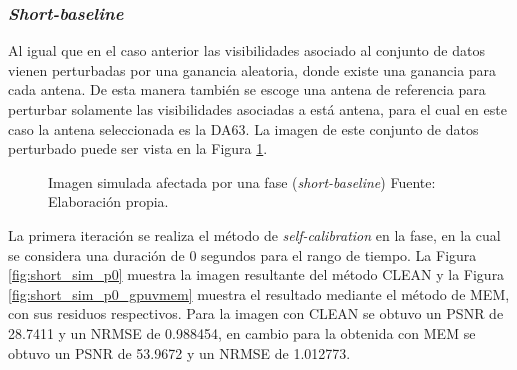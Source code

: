 \subsubsection{\textit{Short-baseline}}

Al igual que en el caso anterior las visibilidades asociado al conjunto de datos vienen perturbadas por una ganancia aleatoria, donde existe una ganancia para cada antena. De esta manera también se escoge una antena de referencia para perturbar solamente las visibilidades asociadas a está antena, para el cual en este caso la antena seleccionada es la DA63. La imagen de este conjunto de datos perturbado puede ser vista en la Figura \ref{fig:dirty_short_baseline}. 

\begin{figure}[!ht]
 \centering
 \caption[Imagen simulada afectada por una fase (\textit{short-baseline})]{Imagen simulada afectada por una fase (\textit{short-baseline}) Fuente: Elaboración propia.}
 \label{fig:dirty_short_baseline}
\end{figure}

La primera iteración se realiza el método de \textit{self-calibration} en la fase, en la cual se considera una duración de 0 segundos para el rango de tiempo. La Figura \ref{fig:short_sim_p0} muestra la imagen resultante del método CLEAN y la Figura \ref{fig:short_sim_p0_gpuvmem} muestra el resultado mediante el método de MEM, con sus residuos respectivos. Para la imagen con CLEAN se obtuvo un PSNR de 28.7411 y un NRMSE de 0.988454, en cambio para la obtenida con MEM se obtuvo un PSNR de 53.9672 y un NRMSE de 1.012773. 

